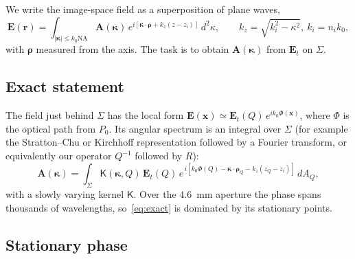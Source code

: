 \documentclass[11pt,a4paper]{article}
\newcommand{\ve}[1]{\bm{#1}}
\begin{document}
We write the image-space field as a superposition of plane waves,
\begin{equation}
 \ve E(\ve r)=\int_{|\boldsymbol\kappa|\le k_0\mathrm{NA}}
 \ve A(\boldsymbol\kappa)\,
 e^{i[\boldsymbol\kappa\cdot\boldsymbol\rho+k_z(z-z_i)]}\,d^2\kappa,
 \qquad k_z=\sqrt{k_i^2-\kappa^2},\ k_i=n_ik_0 ,
 \label{eq:asm}
\end{equation}
with $\boldsymbol\rho$ measured from the axis. The task is to obtain
$\ve A(\boldsymbol\kappa)$ from $\ve E_t$ on $\Sigma$.

\subsection{Exact statement}

The field just behind $\Sigma$ has the local form
$\ve E(\ve x)\simeq\ve E_t(Q)\,e^{ik_0\Phi(\ve x)}$, where $\Phi$ is the optical
path from $P_0$. Its angular spectrum is an integral over $\Sigma$ (for example
the Stratton--Chu or Kirchhoff representation followed by a Fourier transform,
or equivalently our operator $Q^{-1}$ followed by $R$):
\begin{equation}
 \ve A(\boldsymbol\kappa)=\int_\Sigma \mathsf K(\boldsymbol\kappa,Q)\,
 \ve E_t(Q)\,
 e^{\,i[k_0\Phi(Q)-\boldsymbol\kappa\cdot\boldsymbol\rho_Q-k_z(z_Q-z_i)]}\,dA_Q ,
 \label{eq:exact}
\end{equation}
with a slowly varying kernel $\mathsf K$. Over the $4.6$~mm aperture the phase
spans thousands of wavelengths, so~\eqref{eq:exact} is dominated by its
stationary points.

\subsection{Stationary phase}
\end{document}
